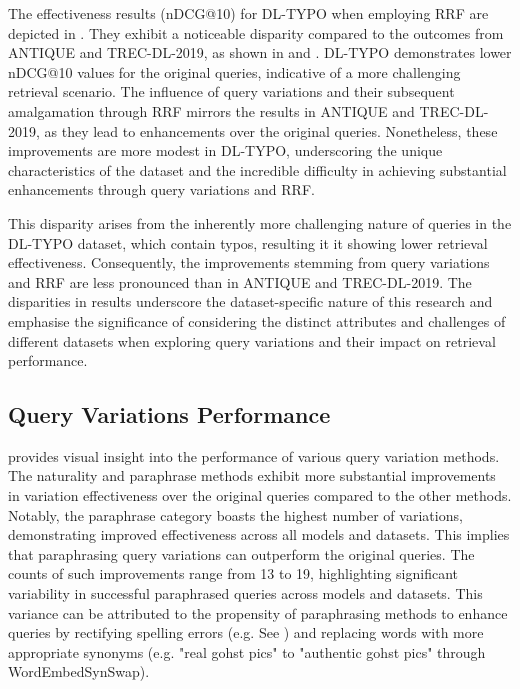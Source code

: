 The effectiveness results (nDCG@10) for DL-TYPO when employing RRF are depicted in . They exhibit a noticeable disparity compared to the outcomes from ANTIQUE and TREC-DL-2019, as shown in  and . DL-TYPO demonstrates lower nDCG@10 values for the original queries, indicative of a more challenging retrieval scenario. The influence of query variations and their subsequent amalgamation through RRF mirrors the results in ANTIQUE and TREC-DL-2019, as they lead to enhancements over the original queries. Nonetheless, these improvements are more modest in DL-TYPO, underscoring the unique characteristics of the dataset and the incredible difficulty in achieving substantial enhancements through query variations and RRF.

This disparity arises from the inherently more challenging nature of queries in the DL-TYPO dataset, which contain typos, resulting it it showing lower retrieval effectiveness. Consequently, the improvements stemming from query variations and RRF are less pronounced than in ANTIQUE and TREC-DL-2019. The disparities in results underscore the dataset-specific nature of this research and emphasise the significance of considering the distinct attributes and challenges of different datasets when exploring query variations and their impact on retrieval performance.

\subsection{Query Variations Performance}


 provides visual insight into the performance of various query variation methods. The naturality and paraphrase methods exhibit more substantial improvements in variation effectiveness over the original queries compared to the other methods. Notably, the paraphrase category boasts the highest number of variations, demonstrating improved effectiveness across all models and datasets. This implies that paraphrasing query variations can outperform the original queries. The counts of such improvements range from 13 to 19, highlighting significant variability in successful paraphrased queries across models and datasets. This variance can be attributed to the propensity of paraphrasing methods to enhance queries by rectifying spelling errors (e.g. See ) and replacing words with more appropriate synonyms (e.g. "real gohst pics" to "authentic gohst pics" through WordEmbedSynSwap).


